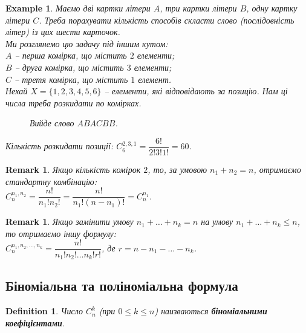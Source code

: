 \documentclass[a4paper, 14pt]{extarticle}
\theoremstyle{theoremdd}
\theoremstyle{theoremdd}
\newtheorem{definition}[theorem]{Definition}
\theoremstyle{theoremdd}
\theoremstyle{theoremdd}
\theoremstyle{theoremdd}
\newtheorem{example}[theorem]{Example}
\theoremstyle{theoremdd}
\theoremstyle{theoremdd}
\theoremstyle{theoremdd}
\theoremstyle{theoremdd}
\theoremstyle{theoremdd}
\theoremstyle{theoremdd}
\newtheorem{remark}[theorem]{Remark}
\theoremstyle{theoremdd}
\theoremstyle{theoremdd}
\theoremstyle{theoremdd}
\theoremstyle{theoremdd}
\begin{document}
\begin{example}
Маємо дві картки літери $A$, три картки літери $B$, одну картку літери $C$. Треба порахувати кількість способів скласти слово (послідовність літер) із цих шести карточок.\\
Ми розглянемо цю задачу під іншим кутом: \\
$A$ -- перша комірка, що містить $2$ елементи;\\
$B$ -- друга комірка, що містить $3$ елементи;\\
$C$ -- третя комірка, що містить $1$ елемент.\\
Нехай $X = \{1,2,3,4,5,6\}$ -- елементи, які відповідають за позицію. Нам ці числа треба розкидати по комірках.
\begin{figure}[H]
\centering
{}
\caption*{Вийде слово $ABACBB$.}
\end{figure}
Кількість розкидати позиції: $C_6^{2,3,1} = \dfrac{6!}{2! 3! 1!} = 60$.
\end{example}

\begin{remark}
Якщо кількість комірок $2$, то, за умовою $n_1 + n_2 = n$, отримаємо стандартну комбінацію:\\
$C_n^{n_1,n_2} = \dfrac{n!}{n_1! n_2!} = \dfrac{n!}{n_1! (n-n_1)!} = C_n^{n_1}$.
\end{remark}

\begin{remark}
Якщо замінити умову $n_1 + \dots + n_k = n$ на умову $n_1 + \dots + n_k \leq n$, то отримаємо іншу формулу:\\
$C_n^{n_1,n_2,\dots,n_k} = \dfrac{n!}{n_1! n_2! \dots n_k! r!}$, де $r = n - n_1 - \dots - n_k$.
\end{remark}

\subsection{Біноміальна та поліноміальна формула}
\begin{definition}
Число $C_n^k$ (при $0 \leq k \leq n$) наизваються \textbf{біноміальними коефіцієнтами}.
\end{definition}
\end{document}
